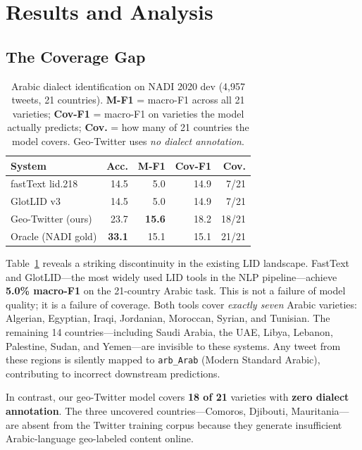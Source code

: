 \documentclass[11pt]{article}
\begin{document}
\section{Results and Analysis}
\label{sec:results}

\subsection{The Coverage Gap}
\label{sec:coverage}

\begin{table}[t]
\centering
\small
\setlength{\tabcolsep}{5pt}
\begin{tabular}{lrrrr}
\toprule
\textbf{System} & \textbf{Acc.} & \textbf{M-F1} & \textbf{Cov-F1} & \textbf{Cov.} \\
\midrule
fastText lid.218    & 14.5 & 5.0  & 14.9 &  7/21 \\
GlotLID v3          & 14.5 & 5.0  & 14.9 &  7/21 \\
\midrule
Geo-Twitter (ours)  & 23.7 & \textbf{15.6} & 18.2 & 18/21 \\
Oracle (NADI gold)  & \textbf{33.1} & 15.1 & 15.1 & 21/21 \\
\bottomrule
\end{tabular}
\caption{Arabic dialect identification on NADI 2020 dev (4{,}957 tweets,
21 countries). \textbf{M-F1} = macro-F1 across all 21 varieties;
\textbf{Cov-F1} = macro-F1 on varieties the model actually predicts;
\textbf{Cov.} = how many of 21 countries the model covers.
Geo-Twitter uses \emph{no dialect annotation}.}
\label{tab:main-arabic}
\end{table}

Table~\ref{tab:main-arabic} reveals a striking discontinuity in the existing
LID landscape. FastText and GlotLID---the most widely used LID tools in the
NLP pipeline---achieve \textbf{5.0\% macro-F1} on the 21-country Arabic task.
This is not a failure of model quality; it is a failure of coverage.  Both
tools cover \emph{exactly seven} Arabic varieties: Algerian, Egyptian, Iraqi,
Jordanian, Moroccan, Syrian, and Tunisian. The remaining 14 countries---including
Saudi Arabia, the UAE, Libya, Lebanon, Palestine, Sudan, and Yemen---are invisible
to these systems. Any tweet from these regions is silently mapped to
\texttt{arb\_Arab} (Modern Standard Arabic), contributing to incorrect
downstream predictions.

In contrast, our geo-Twitter model covers \textbf{18 of 21} varieties with
\textbf{zero dialect annotation}. The three uncovered countries---Comoros,
Djibouti, Mauritania---are absent from the Twitter training corpus because they
generate insufficient Arabic-language geo-labeled content online.
\end{document}

